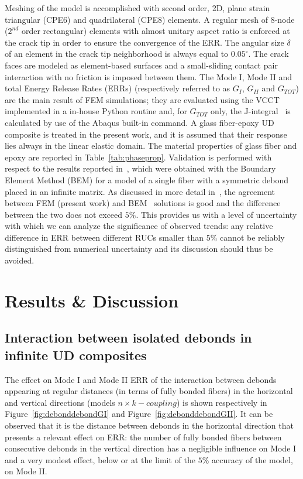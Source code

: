 \documentclass[smallextended]{svjour3}       %
\begin{document}
Meshing of the model is accomplished with second order, 2D, plane strain triangular (CPE6) and quadrilateral (CPE8) elements. A regular mesh of 8-node ($2^{nd}$ order rectangular) elements with almost unitary aspect ratio is enforced at the crack tip in order to ensure the convergence of the ERR. The angular size $\delta$ of an element in the crack tip neighborhood is always equal to $0.05^{\circ}$. The crack faces are modeled as element-based surfaces and a small-sliding contact pair interaction with no friction is imposed between them. The Mode I, Mode II and total Energy Release Rates (ERRs) (respectively referred to as $G_{I}$, $G_{II}$ and $G_{TOT}$) are the main result of FEM simulations; they are evaluated using the VCCT~\cite{Krueger2004} implemented in a in-house Python routine and, for $G_{TOT}$ only, the J-integral~\cite{Rice1968} is calculated by use of the Abaqus built-in command. A glass fiber-epoxy UD composite is treated in the present work, and it is assumed that their response lies always in the linear elastic domain. The material properties of glass fiber and epoxy are reported in Table~\ref{tab:phaseprop}. Validation is performed with respect to the results reported in~\cite{Paris2007,Sandino2016}, which were obtained with the Boundary Element Method (BEM) for a model of a single fiber with a symmetric debond placed in an infinite matrix. As discussed in more detail in~\cite{DiStasio2019}, the agreement between FEM (present work) and BEM~\cite{Paris2007,Sandino2016} solutions is good and the difference between the two does not exceed $5\%$. This provides us with a level of uncertainty with which we can analyze the significance of observed trends: any relative difference in ERR between different RUCs smaller than $5\%$ cannot be reliably distinguished from numerical uncertainty and its discussion should thus be avoided.

\section{Results \& Discussion}\label{sec:results}

\subsection{Interaction between isolated debonds in infinite UD composites}\label{subsec:chesstable}

The effect on Mode I and Mode II ERR of the interaction between debonds appearing at regular distances (in terms of fully bonded fibers) in the horizontal and vertical directions (models $n\times k-coupling$) is shown respectively in Figure~\ref{fig:debonddebondGI} and Figure~\ref{fig:debonddebondGII}. It can be observed that it is the distance between debonds in the horizontal direction that presents a relevant effect on ERR: the number of fully bonded fibers between consecutive debonds in the vertical direction has a negligible influence on Mode I and a very modest effect, below or at the limit of the $5\%$ accuracy of the model, on Mode II.
\end{document}
